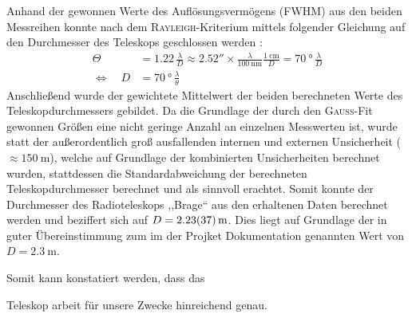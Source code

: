     Anhand der gewonnen Werte des Auflösungsvermögens (FWHM) aus den beiden Messreihen konnte nach dem \textsc{Rayleigh}-Kriterium mittels folgender Gleichung auf den Durchmesser des Teleskops geschlossen werden \cite{Karttunen2013}:
    \begin{align}
        \Theta &= 1.22 \, \frac{\lambda}{D} \approx \ang{;;2.52} \times \frac{\lambda}{\SI{100}{\nano \metre}} \frac{\SI{1}{\centi \metre}}{D} = \SI{70}{\degree} \, \frac{\lambda}{D}\\
        \Leftrightarrow \quad D &= \SI{70}{\degree} \, \frac{\lambda}{\theta}
    \end{align}
    Anschließend wurde der gewichtete Mittelwert der beiden berechneten Werte des Teleskopdurchmessers gebildet. Da die Grundlage der durch den \textsc{Gauß}-Fit gewonnen Größen eine nicht geringe Anzahl an einzelnen Messwerten ist, wurde statt der außerordentlich groß ausfallenden internen und externen Unsicherheit ($\approx \SI{150}{\metre}$), welche auf Grundlage der kombinierten Unsicherheiten berechnet wurden, stattdessen die Standardabweichung der berechneten Teleskopdurchmesser berechnet und als sinnvoll erachtet. Somit konnte der Durchmesser des Radioteleskops ,,Brage`` aus den erhaltenen Daten berechnet werden und beziffert sich auf $D = \SI{2.23 \pm 0.37}{\metre}$. Dies liegt auf Grundlage der in guter Übereinstimmung zum im der Projket Dokumentation \cite{Usermanual} genannten Wert von $D = \SI{2.3}{\metre}$. 
    
    
    Somit kann konstatiert werden, dass das 

    Teleskop arbeit für unsere Zwecke hinreichend genau.